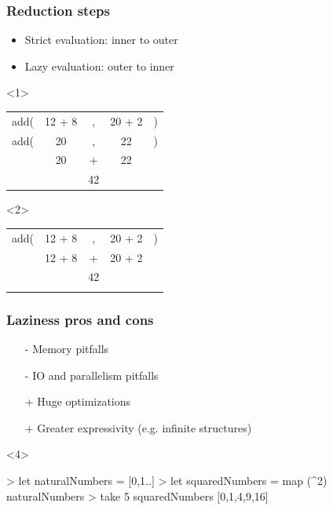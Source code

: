\documentclass[17pt]{beamer}
\renewcommand{\(}[1]{\begin{columns}[#1]}
\renewcommand{\)}{\end{columns}}
\newcommand{\<}[1]{\begin{column}{#1}}
\renewcommand{\>}{\end{column}}
\begin{document}
\begin{frame}
  \frametitle{Reduction steps}
  \begin{itemize}
  \item<1-> Strict evaluation: inner to outer
  \item<2-> Lazy evaluation: outer to inner
  \end{itemize}
  \begin{onlyenv}<1>
    \begin{center}
      \begin{tabular}{ c c c c c }
        \\ add( & 12 + 8 & ,  & 20 + 2 & )
        \\ add( & 20     & ,  & 22     & )
        \\      & 20     & +  & 22     &
        \\      &        & 42 &        &
      \end{tabular}
    \end{center}
  \end{onlyenv}
  \begin{onlyenv}<2>
    \begin{center}
      \begin{tabular}{ c c c c c }
        \\ add( & 12 + 8 & ,  & 20 + 2 & )
        \\      & 12 + 8 & +  & 20 + 2 &
        \\      &        & 42 &        &
        \\      &        &    &        &
      \end{tabular}
    \end{center}
  \end{onlyenv}
\end{frame}

\begin{frame}[fragile]
\frametitle{Laziness pros and cons}
\begin{center}
\begin{itemize}[<+->]
\item[-] Memory pitfalls
\item[-] IO and parallelism pitfalls
\item[+] Huge optimizations
\item[+] Greater expressivity (e.g. infinite structures)
\end{itemize}
\end{center}
\begin{minipage}[c][.3\textheight]{\textwidth}
\begin{center}
\begin{onlyenv}<4>
  \begin{code}
        > let naturalNumbers = [0,1..]
        > let squaredNumbers = map (^2) naturalNumbers
        > take 5 squaredNumbers
        [0,1,4,9,16]
  \end{code}
\end{onlyenv}
\end{center}
\end{minipage}
\end{frame}
\end{document}
